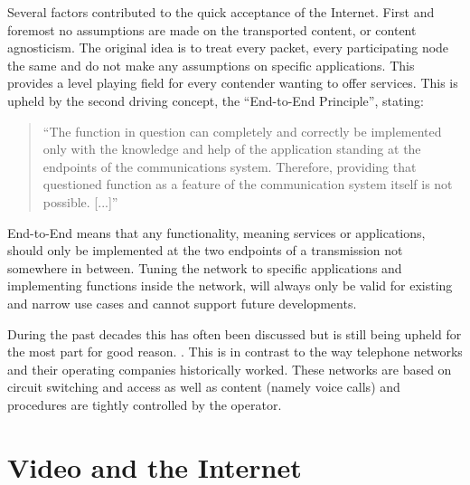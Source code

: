 
Several factors contributed to the quick acceptance of the Internet. First and foremost no assumptions are made on the transported content, or content agnosticism. The original idea is to treat every packet, every participating node the same and do not make any assumptions on specific applications. This provides a level playing field for every contender wanting to offer services. This is upheld by the second driving concept, the ``End-to-End Principle'', \cite{saltzer1984end2end} stating:

\begin{quote}
``The function in question can completely and correctly be implemented only with the knowledge and help of the application standing at the endpoints of the communications system. Therefore, providing that questioned function as a feature of the communication system itself is not possible. [...]''
\end{quote}

End-to-End means that any functionality, meaning services or applications, should only be implemented at the two endpoints of a transmission not somewhere in between. Tuning the network to specific applications and implementing functions inside the network, will always only be valid for existing and narrow use cases and cannot support future developments.

During the past decades this has often been discussed  \cite{bhattacharjee1997active, blumenthal2001rethinking, isenberg1997rise, lemley2000end} but is still being upheld for the most part for good reason. . This is in contrast to the way telephone networks and their operating companies historically worked. These networks are based on circuit switching and access as well as content (namely voice calls) and procedures are tightly controlled by the operator.

\section{Video and the Internet}

